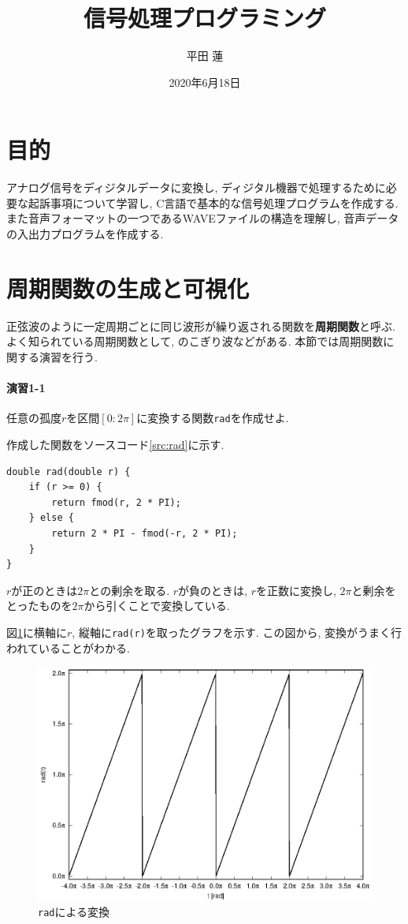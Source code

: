 \documentclass[titlepage]{jsarticle}
\title{信号処理プログラミング}
\author{平田 蓮}
\date{2020年6月18日}
\begin{document}
\maketitle
\section{目的}
    アナログ信号をディジタルデータに変換し, ディジタル機器で処理するために必要な起訴事項について学習し,
    C言語で基本的な信号処理プログラムを作成する.
    また音声フォーマットの一つであるWAVEファイルの構造を理解し, 音声データの入出力プログラムを作成する.

\section{周期関数の生成と可視化}
    正弦波のように一定周期ごとに同じ波形が繰り返される関数を\textbf{周期関数}と呼ぶ.
    よく知られている周期関数として, のこぎり波などがある.
    本節では周期関数に関する演習を行う.

    \paragraph{演習1-1} 任意の孤度$r$を区間$[0:2\pi]$に変換する関数\verb|rad|を作成せよ.

        作成した関数をソースコード\ref{src:rad}に示す.

        \begin{lstlisting}[caption=rad.c, label=src:rad]
double rad(double r) {
    if (r >= 0) {
        return fmod(r, 2 * PI);
    } else {
        return 2 * PI - fmod(-r, 2 * PI);
    }
}
        \end{lstlisting}

        $r$が正のときは$2\pi$との剰余を取る.
        $r$が負のときは, $r$を正数に変換し, $2\pi$と剰余をとったものを$2\pi$から引くことで変換している.

        図\ref{fig:rad}に横軸に$r$, 縦軸に\verb|rad(r)|を取ったグラフを示す.
        この図から, 変換がうまく行われていることがわかる.

        \begin{figure}[ht]
            \centering
            \includegraphics[width=12cm]{images/rad.eps}
            \cprotect\caption{\verb|rad|による変換}
            \label{fig:rad}
        \end{figure}
\end{document}
